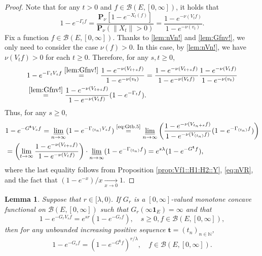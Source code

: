\documentclass[12pt,a4paper]{amsart}
\numberwithin{equation}{section}
\theoremstyle{plain}
\newtheorem{lem}[thm]{Lemma}
\theoremstyle{definition}
\theoremstyle{remark}
\begin{document}
\begin{proof}
	Note that for any $t>0$ and $f\in \mathcal B(E,[0,\infty])$, it holds that
\begin{equation}\label{lem:Gfnv!}
	1 - e^{- \Gamma_t f}
	= \frac{ \mathbf P_\nu [ 1 - e^{- X_t(f)}]}{ \mathbf P_\nu (\|X_t\| > 0)}
	= \frac{ 1 - e^{- \nu(V_tf)} }{ 1 - e^{- \nu(v_t)}}.
\end{equation}
	Fix a function $f\in \mathcal B(E,[0,\infty])$.
	Thanks to \eqref{lem:nVn!} and \eqref{lem:Gfnv!}, we only need to consider the case $\nu(f) > 0$.
	In this case, by \eqref{lem:nVn!}, we have $\nu(V_tf)>0$ for each $t\geq 0$.
	Therefore, for any $s,t\geq 0$,
\begin{align}
	& 1 - e^{- \Gamma_t V_s f}
	\overset{\eqref{lem:Gfnv!}}= \frac{ 1 - e^{- \nu(V_{t+s} f)} }{ 1 - e^{- \nu(v_t)}}
	= \frac{ 1 - e^{- \nu(V_{t+s} f)} }{ 1 - e^{- \nu(V_tf)}} \frac{ 1 - e^{ - \nu(V_tf)}}{ 1 - e^{- \nu(v_t)}}
	\\ &  \label{eq:Gtb.5}\overset{\eqref{lem:Gfnv!}}= \frac{ 1 - e^{- \nu(V_{t+s} f)} }{ 1 - e^{- \nu(V_tf)}} ( 1 - e^{- \Gamma_t f}).
\end{align}
	Thus, for any $s\geq 0$,
\begin{align}
	& 1 - e^{- G^{\mathbf t} V_s f}
	= \varliminf_{n\to \infty} ( 1 - e^{- \Gamma_{(t_n)} V_s f})
	\overset{\text{\eqref{eq:Gtb.5}}}= \varliminf_{n\to \infty} \left( \frac{ 1 - e^{- \nu(V_{t_n+s}f)}}{ 1 - e^{- \nu(V_{(t_n)}f)}} (1 - e^{- \Gamma_{(t_n)} f}) \right)
	\\& = \left( \lim_{t \to \infty} \frac{ 1 - e^{- \nu(V_{t+s}f)}}{ 1 - e^{- \nu(V_{t}f)}} \right) \cdot \varliminf_{n\to \infty} (1 - e^{- \Gamma_{(t_n)} f} )
	= e^{s\lambda} (1 - e^{- G^{\mathbf t}f}),
\end{align}
	where the last equality follows from Proposition \ref{prop:Vf1::H1:H2::Y}, \eqref{eq:nVR}, and the fact that
	$
	(1-e^{-x}) /x \xrightarrow[x\to 0]{} 1.
	$
\end{proof}

\begin{lem} \label{prop:G*:H1:H2:H3:H4}
	Suppose that $r \in [\lambda,0)$.
	If $G_r$ is a $[0,\infty]$-valued monotone concave functional on $\mathcal B(E,[0,\infty])$ 
	such that $G_r(\infty \mathbf 1_E) = \infty$ and that
\begin{equation}
	1 - e^{-G_r V_s f}
	= e^{s r} (1 - e^{- G_r f}),
	\quad s\geq 0, f\in \mathcal B(E,[0,\infty]),
\end{equation}
	then for any unbounded increasing positive sequence $\mathbf t = (t_n)_{n\in \mathbb N}$,
\begin{equation}
	1 - e^{-G_r f} = (1 - e^{- G^\mathbf t f})^{r/\lambda}, \quad f \in \mathcal B(E,[0,\infty]).
\end{equation}
\end{lem}
\end{document}

